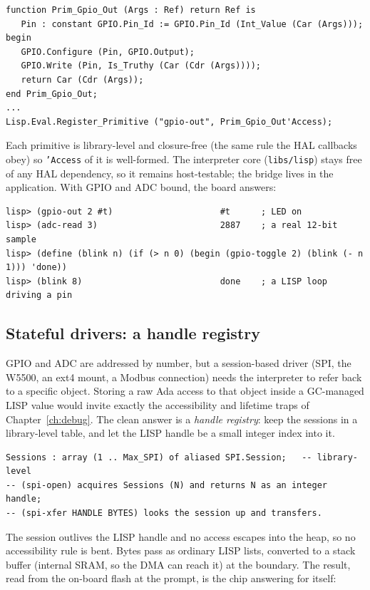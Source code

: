 \begin{lstlisting}
function Prim_Gpio_Out (Args : Ref) return Ref is
   Pin : constant GPIO.Pin_Id := GPIO.Pin_Id (Int_Value (Car (Args)));
begin
   GPIO.Configure (Pin, GPIO.Output);
   GPIO.Write (Pin, Is_Truthy (Car (Cdr (Args))));
   return Car (Cdr (Args));
end Prim_Gpio_Out;
...
Lisp.Eval.Register_Primitive ("gpio-out", Prim_Gpio_Out'Access);
\end{lstlisting}

Each primitive is library-level and closure-free (the same rule the HAL callbacks
obey) so \texttt{'Access} of it is well-formed. The interpreter core
(\texttt{libs/lisp}) stays free of any HAL dependency, so it remains host-testable;
the bridge lives in the application. With GPIO and ADC bound, the board answers:

\begin{lstlisting}[style=sh]
lisp> (gpio-out 2 #t)                     #t      ; LED on
lisp> (adc-read 3)                        2887    ; a real 12-bit sample
lisp> (define (blink n) (if (> n 0) (begin (gpio-toggle 2) (blink (- n 1))) 'done))
lisp> (blink 8)                           done    ; a LISP loop driving a pin
\end{lstlisting}

\subsection{Stateful drivers: a handle registry}

GPIO and ADC are addressed by number, but a session-based driver (SPI, the W5500,
an ext4 mount, a Modbus connection) needs the interpreter to refer back to a
specific object. Storing a raw Ada access to that object inside a GC-managed LISP
value would invite exactly the accessibility and lifetime traps of
Chapter~\ref{ch:debug}. The clean answer is a \emph{handle registry}: keep the
sessions in a library-level table, and let the LISP handle be a small integer index
into it.

\begin{lstlisting}
Sessions : array (1 .. Max_SPI) of aliased SPI.Session;   -- library-level
-- (spi-open) acquires Sessions (N) and returns N as an integer handle;
-- (spi-xfer HANDLE BYTES) looks the session up and transfers.
\end{lstlisting}

The session outlives the LISP handle and no access escapes into the heap, so no
accessibility rule is bent. Bytes pass as ordinary LISP lists, converted to a stack
buffer (internal SRAM, so the DMA can reach it) at the boundary. The result, read
from the on-board flash at the prompt, is the chip answering for itself:

